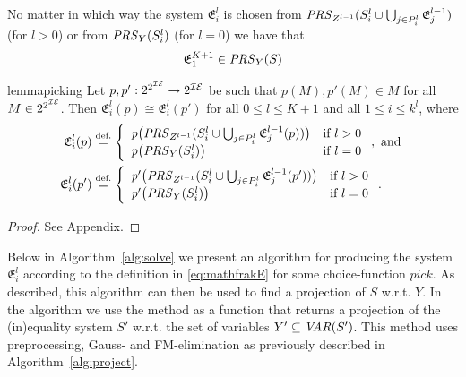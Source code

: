\begin{cor}
No matter in which way the system $\mathfrak{E}^l_i$ is chosen from $\mathit{PRS}_{Z^{l-1}}(S^l_i \cup\bigcup_{j\in P^l_i}\mathfrak{E}^{l-1}_j)$ (for $l>0$) or from $\mathit{PRS}_{Y}(S^l_i)$ (for $l=0$) we have that 
\[
\mathfrak{E}^{K+1}_1 \in \mathit{PRS}_{Y}(S)
\]
\end{cor}
%
\begin{restatable}{lemma}{picking}\label{lm:picking}
Let $p,p':2^{2^{\mathcal{IE}}}\to 2^{\mathcal{IE}}$ be such that $p(M),p'(M)\in M$ for all $M\in 2^{2^{\mathcal{IE}}}$. Then $\mathfrak{E}^l_i(p)\cong\mathfrak{E}^l_i(p')$ for all $0\leq l\leq K+1$ and all $1\leq i\leq k^l$, where
\begin{align*}
\mathfrak{E}^l_i(p) &\overset{\text{def.}}= \left\{\begin{array}{ll}
		\mathit{p}\big(\mathit{PRS}_{Z^{l-1}}(S^l_i \cup\bigcup_{j\in P^l_i}\mathfrak{E}^{l-1}_j(p))\big) &\text{if }l>0\\
		\mathit{p}\big(\mathit{PRS}_{Y}(S^l_i)\big)&\text{if } l = 0
\end{array}\right.,\text{ and }\\
\mathfrak{E}^l_i(p') &\overset{\text{def.}}= \left\{\begin{array}{ll}
		\mathit{p'}\big(\mathit{PRS}_{Z^{l-1}}(S^l_i \cup\bigcup_{j\in P^l_i}\mathfrak{E}^{l-1}_j(p'))\big) &\text{if }l>0\\
		\mathit{p'}\big(\mathit{PRS}_{Y}(S^l_i)\big)&\text{if } l = 0
\end{array}\right..
\end{align*}
\end{restatable}
\begin{proof}
See Appendix.
\end{proof}
%
Below in Algorithm~\ref{alg:solve} we present an algorithm for producing the system $\mathfrak{E}^l_i$ according to the definition in \eqref{eq:mathfrakE} for some choice-function $\mathit{pick}$. As described, this algorithm can then be used to  find a projection of $S$ w.r.t. $Y$. In the algorithm we use the method  as a function that returns a projection of the (in)equality system $S'$ w.r.t. the set of variables $Y'\subseteq\mathit{VAR}(S')$. This method uses preprocessing, Gauss- and FM-elimination as previously described in Algorithm~\ref{alg:project}. 

